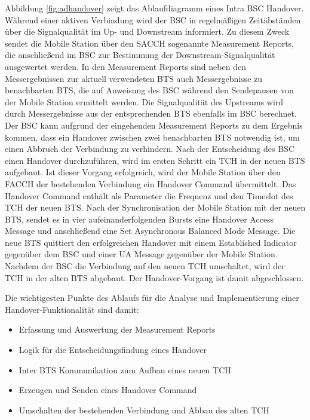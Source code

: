 Abbildung \ref{fig:adhandover} zeigt das Ablaufdiagramm eines Intra BSC Handover. Während einer aktiven Verbindung wird der BSC in regelmäßigen Zeitäbständen über die Signalqualität im Up- und Downstream informiert. Zu diesem Zweck sendet die Mobile Station über den SACCH sogenannte Measurement Reports, die anschließend im BSC zur Bestimmung der Downstream-Signalqualität ausgewertet werden. In den Measurement Reports sind neben den Messergebnissen zur aktuell verwendeten BTS auch Messergebnisse zu benachbarten BTS, die auf Anweisung des BSC während den Sendepausen von der Mobile Station ermittelt werden. Die Signalqualität des Upstreams wird durch Messergebnisse aus der entsprechenden BTS ebenfalls im BSC berechnet. Der BSC kann aufgrund der eingehenden Measurement Reports zu dem Ergebnis kommen, dass ein Handover zwischen zwei benachbarten BTS notwendig ist, um einen Abbruch der Verbindung zu verhindern. Nach der Entscheidung des BSC einen Handover durchzuführen, wird im ersten Schritt ein TCH in der neuen BTS aufgebaut. Ist dieser Vorgang erfolgreich, wird der Mobile Station über den FACCH der bestehenden Verbindung ein Handover Command übermittelt. Das Handover Command enthält als Parameter die Frequenz und den Timeslot des TCH der neuen BTS. Nach der Synchronisation der Mobile Station mit der neuen BTS, sendet es in vier aufeinanderfolgenden Bursts eine Handover Access Message und anschließend eine Set Asynchronous Balanced Mode Message. Die neue BTS quittiert den erfolgreichen Handover mit einem Established Indicator gegenüber dem BSC und einer UA Message gegenüber der Mobile Station. Nachdem der BSC die Verbindung auf den neuen TCH umschaltet, wird der TCH in der alten BTS abgebaut. Der Handover-Vorgang ist damit abgeschlossen.

Die wichtigesten Punkte des Ablaufs für die Analyse und Implementierung einer Handover-Funktionalität sind damit:

\begin{itemize}
 \item Erfassung und Auswertung der Measurement Reports
 \item Logik für die Entscheidungsfindung eines Handover
 \item Inter BTS Kommunikation zum Aufbau eines neuen TCH
 \item Erzeugen und Senden eines Handover Command
 \item Umschalten der bestehenden Verbindung und Abbau des alten TCH
\end{itemize}

